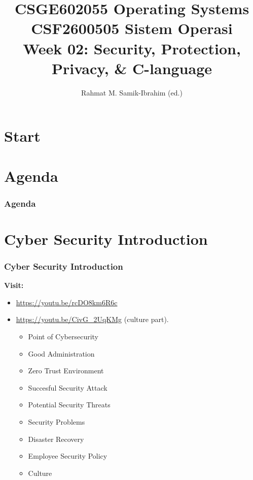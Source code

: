 \documentclass[xcolor=table, notheorems, hyperref={pdfpagelabels=false}]{beamer}
\title[\kopikopi]
{CSGE602055 Operating Systems \\ 
CSF2600505 Sistem Operasi \\
Week 02:
Security, Protection, Privacy, \& C-language}
\author{Rahmat M. Samik-Ibrahim (ed.)}
\institute[UI]
{
University of Indonesia \\
\medskip
\url{https://os.vlsm.org/Slides/os02.pdf}
\\ \texttt{Always check for the latest revision!}
}
\date{\revision}
\begin{document}
\section{Start}
\begin{frame}
\titlepage
\end{frame}




\section{Agenda}
\begin{frame}
\frametitle{Agenda}
\tableofcontents 
\end{frame}




\section{Cyber Security Introduction}
\begin{frame}[fragile]
\frametitle{Cyber Security Introduction}

\textbf{Visit:}
\begin{itemize}
\item \url{https://youtu.be/rcDO8km6R6c}
\item \url{https://youtu.be/CivG_2UqKMg} (culture part).
\begin{itemize}
\item Point of Cybersecurity
\item Good Administration
\item Zero Trust Environment
\item Succesful Security Attack
\item Potential Security Threats
\item Security Problems
\item Disaster Recovery
\item Employee Security Policy
\item Culture
\end{itemize}
\end{itemize}
\end{frame}
\end{document}
